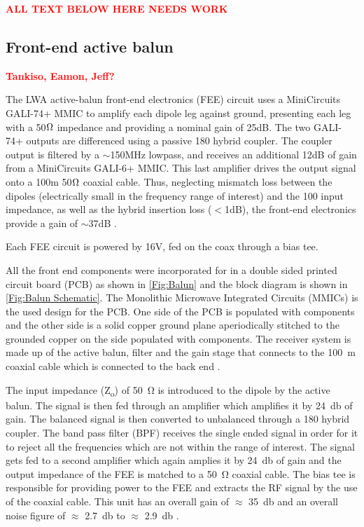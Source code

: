 \documentclass{ws-jai}
\newcommand{\attention}[1]{\textcolor{red}{\bf {#1}}}
\begin{document}
\attention{ALL TEXT BELOW HERE NEEDS WORK}

\subsection{Front-end active balun}
\attention{Tankiso, Eamon, Jeff?} \\
\label{section:FEE}

The LWA active-balun front-end electronics (FEE) circuit uses a MiniCircuits GALI-74+ MMIC 
to amplify each dipole leg against ground, presenting each leg with a 50$\ohm$ impedance 
and providing a nominal gain of 25dB. The two GALI-74+ outputs are differenced using a 
passive {180\degree} hybrid coupler. The coupler output is filtered by a $\sim$150MHz lowpass, 
and receives an additional 12dB of gain from a MiniCircuits GALI-6+ MMIC. This last amplifier 
drives the output signal onto a 100m 50$\ohm$ coaxial cable. Thus, neglecting mismatch loss 
between the dipoles (electrically small in the frequency range of interest) and the 100{\ohm} 
input impedance, as well as the hybrid insertion loss ($<$1dB), the front-end electronics 
provide a gain of $\sim$37dB \cite{2012PASP..124.1090H}. 

Each FEE circuit is powered by 16V, fed on the coax through a bias tee.



\iffalse

All the front end components were incorporated for in a double sided
printed circuit board (PCB) as shown in \autoref{Fig:Balun} and the
block diagram is shown in \autoref{Fig:Balun Schematic}. The
Monolithic Microwave Integrated Circuits (MMICs) is the used design
for the PCB. One side of the PCB is populated with components and the
other side is a solid copper ground plane aperiodically stitched to
the grounded copper on the side populated with components. The
receiver system is made up of the active balun, filter and the gain
stage that connects to the \SI{100}{\metre} coaxial cable which is
connected to the back end \cite{2012PASP..124.1090H}.

The input impedance (Z\textsubscript{o}) of \SI{50}{\ohm} is
introduced to the dipole by the active balun. The signal is then fed
through an amplifier which amplifies it by \SI{+24}{\decibel} of
gain. The balanced signal is then converted to unbalanced through a
180 \degree hybrid coupler. The band pass filter (BPF) receives the
single ended signal in order for it to reject all the frequencies
which are not within the range of interest. The signal gets fed to a
second amplifier which again amplies it by \SI{+24}{\decibel} of gain
and the output impedance of the FEE is matched to a \SI{50}{\ohm}
coaxial cable. The bias tee is responsible for providing power to the
FEE and extracts the RF signal by the use of the coaxial cable. This
unit has an overall gain of $\approx$ \SI{35}{\decibel} and an overall
noise figure of $\approx$ \SI{2.7}{\decibel} to $\approx$
\SI{2.9}{\decibel} \cite{Memo35}.
\end{document}
